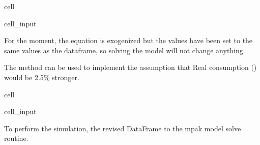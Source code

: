\documentclass[letterpaper,10pt,english]{jupyterBook}
\begin{document}
\begin{sphinxuseclass}{cell}\begin{sphinxVerbatimInput}

\begin{sphinxuseclass}{cell_input}
\begin{sphinxVerbatim}[commandchars=\\\{\}]
 
\end{sphinxVerbatim}

\end{sphinxuseclass}\end{sphinxVerbatimInput}

\end{sphinxuseclass}
\sphinxAtStartPar
For the moment, the equation is exogenized but the values have been set to the same values as the  dataframe, so solving the model will not change anything.

\sphinxAtStartPar
The  method can be used to implement the assumption that Real consumption () would be 2.5\% stronger.

\begin{sphinxuseclass}{cell}\begin{sphinxVerbatimInput}

\begin{sphinxuseclass}{cell_input}
\begin{sphinxVerbatim}[commandchars=\\\{\}]
\end{sphinxVerbatim}

\end{sphinxuseclass}\end{sphinxVerbatimInput}

\end{sphinxuseclass}
\sphinxAtStartPar
To perform the simulation, the revised  DataFrame to the mpak model solve routine.

\sphinxAtStartPar
{}
\end{document}
